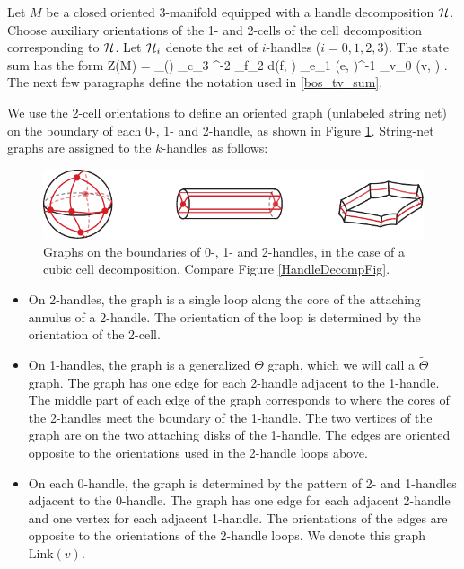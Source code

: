 Let $M$ be a closed oriented 3-manifold equipped with a handle decomposition $\mathcal{H}$.
Choose auxiliary orientations of the 1- and 2-cells of the cell decomposition corresponding to $\mathcal{H}$.
Let $\mathcal{H}_i$ denote the set of $i$-handles ($i = 0,1,2,3$).
The state sum has the form
\be \label{bos_tv_sum}
	Z(M) = \sum_{\beta\in\mcl(\mch)}
		\prod_{c\in\mch_3} \mcd^{-2}
		\prod_{f\in\mch_2} d(f, \beta)
		\prod_{e\in\mch_1} \widetilde\Theta(e, \beta)^{-1}
		\prod_{v\in\mch_0} (v, \beta) .
\ee
The next few paragraphs define the notation used in \eqref{bos_tv_sum}.

We use the 2-cell orientations to define an oriented graph (unlabeled string net) on the boundary of each 0-, 1- and 2-handle,
as shown in Figure \ref{TwoHandleToGraph}.
String-net graphs are assigned to the $k$-handles as follows:
\begin{figure}
\begin{center}
\includegraphics[scale = 1]{NetsonHandles.pdf}
\end{center}
\caption{\label{TwoHandleToGraph}%
Graphs on the boundaries of 0-, 1- and 2-handles, in the case of a cubic cell decomposition.
Compare Figure \ref{HandleDecompFig}.}
\end{figure} 
\begin{itemize}
\item On 2-handles, the graph is a single loop along the core of the attaching annulus of a 2-handle.
The orientation of the loop is determined by the orientation of the 2-cell. 
\item On 1-handles, the graph is a generalized $\Theta$ graph, which we will call a $\widetilde\Theta$ graph.
The graph has one edge for each 2-handle adjacent to the 1-handle.
The middle part of each edge of the graph corresponds to where the cores of the 2-handles meet the boundary of the 1-handle.
The two vertices of the graph are on the two attaching disks of the 1-handle.
The edges are oriented opposite to the orientations used in the 2-handle loops above.
\item On each 0-handle, the graph is determined by the pattern of 2- and 1-handles adjacent to the 0-handle.
The graph has one edge for each adjacent 2-handle and one vertex for each adjacent 1-handle.
The orientations of the edges are opposite to the orientations of the 2-handle loops.
We denote this graph $\text{Link}(v)$.
\end{itemize}

